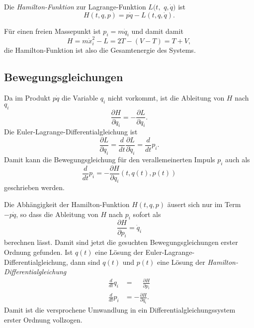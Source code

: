 \begin{definition}
%
Die {\em Hamilton-Funktion} zur Lagrange-Funktion $L(t,$ $q,\dot{q})$ ist
\[
H(t,q,p)
=
p\dot{q}
-
L(t,q,\dot{q}).
\]
\end{definition}

Für einen freien Massepunkt ist $p_i = m\dot{q}_i$ und damit damit
\[
H=
m\dot{x}_i^2
-
L
=
2T
-
(V-T)
=
T+V,
\]
die Hamilton-Funktion ist also die Gesamtenergie des Systems.
%

%
%
\subsection{Bewegungsgleichungen}
Da im Produkt $p\dot{q}$ die Variable $q_i$ nicht vorkommt, ist
die Ableitung von $H$ nach $q_i$
\[
\frac{\partial H}{\partial q_i}
=
-
\frac{\partial L}{\partial q_i}.
\]
Die Euler-Lagrange-Differentialgleichung ist
\[
\frac{\partial L}{\partial q_i}
=
\frac{d}{dt}\frac{\partial L}{\partial \dot{q}_i}
=
\frac{d}{dt} p_i.
\]
Damit kann die Bewegungsgleichung für den verallemeinerten Impuls $p_i$ auch als
\[
\frac{d}{dt}p_i
=
-
\frac{\partial H}{\partial q_i}(t,q(t),p(t))
\]
geschrieben werden.

Die Abhängigkeit der Hamilton-Funktion $H(t,q,p)$ äusert sich nur im Term
$-p\dot{q}$, so dass die Ableitung von $H$ nach $p_i$ sofort als
\[
\frac{\partial H}{\partial p_i}
=
\dot{q}_i
\]
berechnen lässt.
Damit sind jetzt die gesuchten Bewegungsgleichungen erster Ordnung gefunden.
Ist $q(t)$ eine Lösung der Euler-Lagrange-Differentialgleichung, dann sind
$q(t)$ und $p(t)$ eine Lösung der {\em Hamilton-Differentialgleichung}
\begin{align*}
\frac{d}{dt} q_i
&=
\phantom{-}\frac{\partial H}{\partial p_i}
\\
\frac{d}{dt} p_i
&=
-
\frac{\partial H}{\partial q_i}.
\end{align*}
Damit ist die versprochene Umwandlung in ein Differentialgleichungssystem
erster Ordnung vollzogen.


